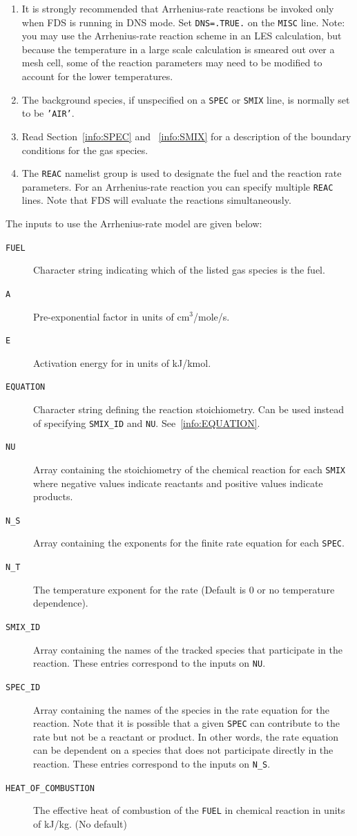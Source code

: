 \documentclass[11pt]{book}
\newcommand{\ct}{\tt\small}
\begin{document}
\begin{enumerate}
\item It is strongly recommended that Arrhenius-rate reactions be invoked only
when FDS is running in DNS mode. Set {\ct DNS=.TRUE.} on the {\ct MISC} line.
Note: you may use the Arrhenius-rate reaction scheme in an
LES calculation, but because the temperature in a large scale calculation
is smeared out over a mesh cell, some of the reaction parameters may need
to be modified to account for the lower temperatures.
\item The background species, if unspecified on a {\ct SPEC} or {\ct SMIX} line, is normally set to be {\ct 'AIR'}.
\item Read Section~\ref{info:SPEC} and ~\ref{info:SMIX} for a description of the boundary
conditions for the gas species.
\item The {\ct REAC} namelist group is used to designate the fuel and the reaction rate
parameters.  For an Arrhenius-rate reaction you can specify multiple {\ct REAC} lines.  Note that FDS will evaluate the reactions simultaneously.
\end{enumerate}

The inputs to use the Arrhenius-rate model are given below:

\begin{description}
\item[{\ct FUEL}] Character string indicating which of the listed gas species is the fuel.
\item[{\ct A}] Pre-exponential factor in units of cm$^3$/mole/s.
\item[{\ct E}] Activation energy for in units of kJ/kmol.
\item[{\ct EQUATION}] Character string defining the reaction stoichiometry.  Can be used instead of specifying {\ct SMIX\_ID} and {\ct NU}.  See~\ref{info:EQUATION}.
\item[{\ct NU}] Array containing the stoichiometry of the chemical reaction for each {\ct SMIX} where negative values indicate reactants and positive values indicate products.
\item[{\ct N\_S}] Array containing the exponents for the finite rate equation for each {\ct SPEC}. 
\item[{\ct N\_T}] The temperature exponent for the rate (Default is 0 or no temperature dependence). 
\item[{\ct SMIX\_ID}] Array containing the names of the tracked species that participate in the reaction.  These entries correspond to the inputs on {\ct NU}. 
\item[{\ct SPEC\_ID}] Array containing the names of the species in the rate equation for the reaction. Note that it is possible that a given {\ct SPEC} can
contribute to the rate but not be a reactant or product. In other words,
the rate equation can be dependent on a species that does not participate directly in the reaction. These entries correspond to the inputs on {\ct N\_S}. 
\item[{\ct HEAT\_OF\_COMBUSTION}] The effective heat of combustion of the {\ct FUEL} in chemical reaction in units of kJ/kg. (No default)
\end{description}
\end{document}

